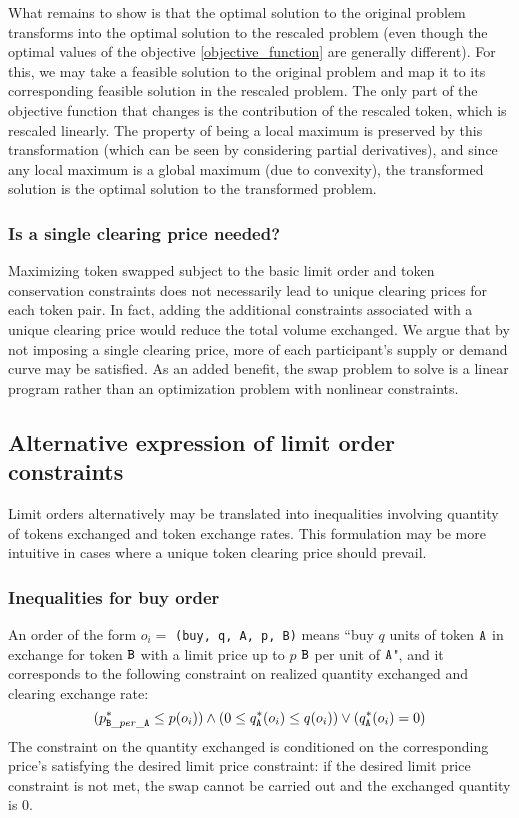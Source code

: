 \documentclass[11pt, reqno]{amsart}
\theoremstyle{definition}
\theoremstyle{remark}
\newcommand{\tA}{\textnormal{\texttt{A}}}
\newcommand{\tB}{\textnormal{\texttt{B}}}
\newcommand{\buy}{\textnormal{\texttt{buy}}}
\begin{document}
What remains to show is that the optimal solution to the original problem
transforms into the optimal solution to the rescaled problem (even though
the optimal values of the objective \eqref{objective_function} are generally
different).
For this, we may take a feasible solution to the original problem and map
it to its corresponding feasible solution in the rescaled problem. The
only part of the objective function that changes is the contribution of
the rescaled token, which is rescaled linearly. The property of being
a local maximum is preserved by this transformation (which can be seen by
considering partial derivatives), and since any local
maximum is a global maximum (due to convexity), the transformed solution
is the optimal solution to the transformed problem.

\subsubsection{Is a single clearing price needed?}

Maximizing token swapped subject to the basic limit order and token
conservation constraints does not necessarily lead to unique clearing prices
for each token pair. In fact, adding the additional constraints associated
with a unique clearing price would reduce the total volume exchanged. We
argue that by not imposing a single clearing price, more of each participant's
supply or demand curve may be satisfied. As an added benefit, the swap
problem to solve is a linear program rather than an optimization problem with
nonlinear constraints.


\subsection{Alternative expression of limit order constraints}
Limit orders alternatively may be translated into inequalities involving
quantity of tokens exchanged and token exchange rates. This formulation may be
more intuitive in cases where a unique token clearing price should prevail.

\subsubsection{Inequalities for buy order}
An order of the form $o_i =$ \texttt{(\buy, q, \tA, p, \tB)} means
``buy $q$ units of token $\tA$ in exchange for token $\tB$ with a limit price
up to $p$ $\tB$ per unit of $\tA$",
and it corresponds to the following constraint on realized quantity exchanged
and clearing exchange rate:
\begin{equation*}
    (p_{\tB\_per\_\tA}^* \leq p(o_i)) \land
    (0 \le q_\tA^*(o_i) \leq q(o_i)) \lor
    (q_\tA^*(o_i) = 0)
\end{equation*}
The constraint on the quantity exchanged is conditioned on the corresponding
price's satisfying the desired limit price constraint: if the desired limit price
constraint is not met, the swap cannot be carried out and the exchanged quantity
is 0.
\end{document}
